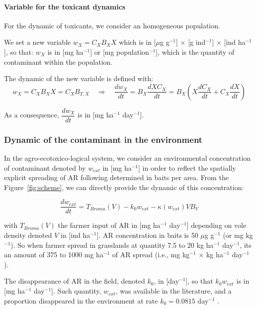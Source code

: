\documentclass[11pt]{article}
\begin{document}
\paragraph{Variable for the toxicant dynamics}
%
For the dynamic of toxicants, we consider an homogeneous population.

We set a new variable $w_X = C_X B_X X$ which is in [$\mu$g g$^{-1}$] $\times$ [g ind$^{-1}$] $\times$ [ind ha$^{-1}$], so that:
%
$w_X$ is in [mg ha$^{-1}$] or [mg population$^{-1}$], which is the quantity of contaminant within the population.

The dynamic of the new variable is defined with:
%
\begin{equation}
w_X = C_X B_X X = C_X B_{T,X} \quad \Rightarrow \quad \frac{dw_X}{dt} = B_X \frac{dX C_X}{dt} = B_X \left( X \frac{dC_X}{dt} + C_X \frac{dX}{dt} \right)
\end{equation}
%

As a consequence, $\dfrac{dw_X}{dt}$ is in [mg ha$^{-1}$ day$^{-1}$].


\subsubsection{Dynamic of the contaminant in the environment}

In the agro-ecotoxico-logical system, we consider an environmental concentration of contaminant denoted by $w_{ext}$ in [mg ha$^{-1}$] in order to reflect the spatially explicit spreading of AR following determined in baits per area.
%
From the Figure~\ref{fig:scheme}, we can directly provide the dynamic of this concentration:


\begin{equation}
\frac{dw_{ext}}{dt} = T_{Broma}(V) - k_0w_{ext} - \kappa(w_{ext})V B_V
\end{equation}

with $T_{Broma}(V)$ the farmer input of AR in [mg ha$^{-1}$ day$^{-1}$] depending on vole density denoted $V$ in [ind ha$^{-1}$].
%
AR concentration in baits is 50 $\mu$g g$^{-1}$ (or mg kg$^{-1}$). So when farmer spread in grasslands at quantity 7.5 to 20 kg ha$^{-1}$ day$^{-1}$, its an amount of 375 to 1000 mg ha$^{-1}$ of AR spread (i.e., mg kg$^{-1}$ $\times$ kg ha$^{-1}$ day$^{-1}$ ).


The disappearance of AR in the field, denoted $k_0$, in [day$^{-1}$], so that $k_0 w_{ext}$ is in [mg ha$^{-1}$ day$^{-1}$].
%
Such quantity, $w_{ext}$, was available in the literature, and a proportion disappeared in the environment at rate $k_0 = 0.0815$ day$^{-1}$ \citep{Sage2008}.
\end{document}
